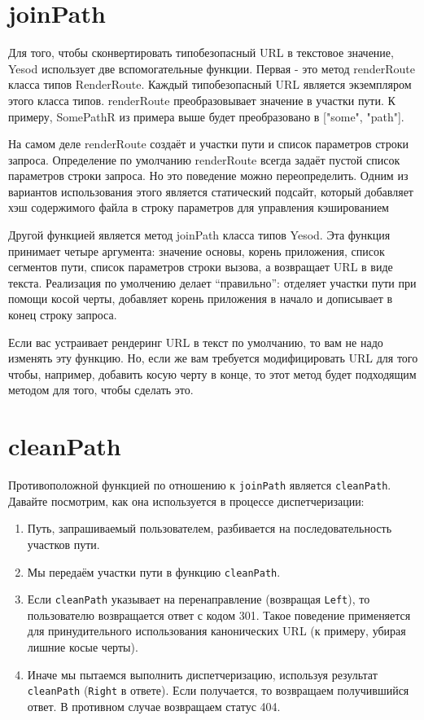 \section {joinPath}

Для того, чтобы сконвертировать типобезопасный URL в текстовое значение, Yesod использует две вспомогательные функции. Первая - это метод renderRoute класса типов RenderRoute. Каждый типобезопасный URL является экземпляром этого класса типов. renderRoute преобразовывает значение в участки пути. К примеру, SomePathR из примера выше будет преобразовано в ["some", "path"].

На самом деле renderRoute создаёт и участки пути и список параметров строки запроса. Определение по умолчанию renderRoute всегда задаёт пустой список параметров строки запроса. Но это поведение можно переопределить. Одним из вариантов использования этого является статический подсайт, который добавляет хэш содержимого файла в строку параметров для управления кэшированием

Другой функцией является метод joinPath класса типов Yesod. Эта функция принимает четыре аргумента: значение основы, корень приложения, список сегментов пути, список параметров строки вызова, а возвращает URL в виде текста. Реализация по умолчению делает ``правильно'': отделяет участки пути при помощи косой черты, добавляет корень приложения в начало и дописывает в конец строку запроса.

Если вас устраивает рендеринг URL в текст по умолчанию, то вам не надо изменять эту функцию. Но, если же вам требуется модифицировать URL для того чтобы, например, добавить косую черту в конце, то этот метод будет подходящим методом для того, чтобы сделать это.

\section {cleanPath}

Противоположной функцией по отношению к \lstinline'joinPath' является \lstinline'cleanPath'. Давайте посмотрим, как она используется в процессе диспетчеризации:

\begin{enumerate}
  \item Путь, запрашиваемый пользователем, разбивается на последовательность участков пути.
  \item Мы передаём участки пути в функцию \lstinline'cleanPath'.
  \item  Если \lstinline'cleanPath' указывает на перенаправление (возвращая \lstinline'Left'), то пользователю возвращается ответ с кодом 301. Такое поведение применяется для принудительного использования канонических URL (к примеру, убирая лишние косые черты).
  \item Иначе мы пытаемся выполнить диспетчеризацию, используя результат \lstinline'cleanPath' (\lstinline'Right' в ответе). Если получается, то возвращаем получившийся ответ. В противном случае возвращаем статус 404.
\end{enumerate}

